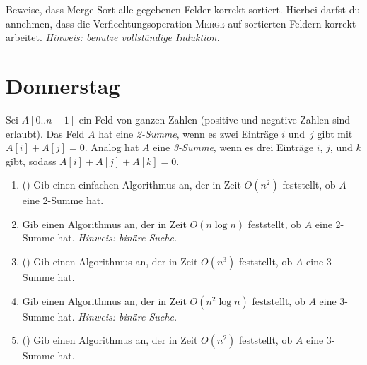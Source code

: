 \documentclass{uebung_cs}
\begin{document}
\begin{aufgabe}
	Beweise, dass Merge Sort alle gegebenen Felder korrekt sortiert. Hierbei darfst du annehmen, dass die Verflechtungsoperation \textsc{Merge} auf sortierten Feldern korrekt arbeitet.
	\emph{Hinweis: benutze vollständige Induktion.}
\end{aufgabe}

\section*{Donnerstag}

\begin{aufgabe}
	Sei $A[0..n-1]$ ein Feld von ganzen Zahlen (positive und negative Zahlen sind erlaubt).
	Das Feld $A$ hat eine \emph{2-Summe}, wenn es zwei Einträge $i$ und~$j$ gibt mit $A[i]+A[j]=0$.
	Analog hat $A$ eine \emph{3-Summe}, wenn es drei Einträge $i$, $j$, und $k$ gibt, sodass $A[i]+A[j]+A[k]=0$.
	\begin{enumerate}
		\item (\warmup) Gib einen einfachen Algorithmus an, der in Zeit $O(n^2)$ feststellt, ob $A$ eine 2-Summe hat.
		\item Gib einen Algorithmus an, der in Zeit $O(n\log n)$ feststellt, ob $A$ eine 2-Summe hat. \emph{Hinweis: binäre Suche.}
		\item (\warmup) Gib einen Algorithmus an, der in Zeit $O(n^3)$ feststellt, ob $A$ eine 3-Summe hat.
		\item Gib einen Algorithmus an, der in Zeit $O(n^2\log n)$ feststellt, ob $A$ eine 3-Summe hat. \emph{Hinweis: binäre Suche.}
		\item (\veryhard) Gib einen Algorithmus an, der in Zeit $O(n^2)$ feststellt, ob $A$ eine 3-Summe hat.
	\end{enumerate}
\end{aufgabe}
\end{document}
